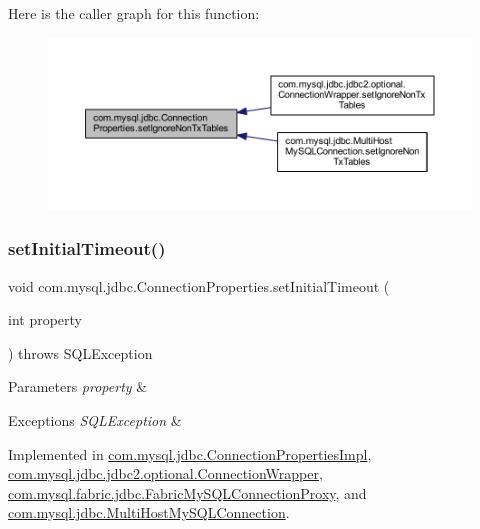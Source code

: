Here is the caller graph for this function\+:\nopagebreak
\begin{figure}[H]
\begin{center}
\leavevmode
\includegraphics[width=350pt]{interfacecom_1_1mysql_1_1jdbc_1_1_connection_properties_aef7c4c2447c9875392d6dff3452d9ac2_icgraph}
\end{center}
\end{figure}
\mbox{\label{interfacecom_1_1mysql_1_1jdbc_1_1_connection_properties_aaf6a88938cc10d9607cbcba5f3ac75a2}} 
\subsubsection{\texorpdfstring{set\+Initial\+Timeout()}{setInitialTimeout()}}
{\footnotesize\ttfamily void com.\+mysql.\+jdbc.\+Connection\+Properties.\+set\+Initial\+Timeout (\begin{DoxyParamCaption}\item[{int}]{property }\end{DoxyParamCaption}) throws S\+Q\+L\+Exception}


\begin{DoxyParams}{Parameters}
{\em property} & \\
\hline
\end{DoxyParams}

\begin{DoxyExceptions}{Exceptions}
{\em S\+Q\+L\+Exception} & \\
\hline
\end{DoxyExceptions}


Implemented in \mbox{\hyperlink{classcom_1_1mysql_1_1jdbc_1_1_connection_properties_impl_afcb603e0165494b6f9a1d0bf6b43e71c}{com.\+mysql.\+jdbc.\+Connection\+Properties\+Impl}}, \mbox{\hyperlink{classcom_1_1mysql_1_1jdbc_1_1jdbc2_1_1optional_1_1_connection_wrapper_af88d96aed55dd2fdd401b0d86dcc700d}{com.\+mysql.\+jdbc.\+jdbc2.\+optional.\+Connection\+Wrapper}}, \mbox{\hyperlink{classcom_1_1mysql_1_1fabric_1_1jdbc_1_1_fabric_my_s_q_l_connection_proxy_a2390b3ac539263d82ddcf9541c296c3d}{com.\+mysql.\+fabric.\+jdbc.\+Fabric\+My\+S\+Q\+L\+Connection\+Proxy}}, and \mbox{\hyperlink{classcom_1_1mysql_1_1jdbc_1_1_multi_host_my_s_q_l_connection_aeab355b0e9150013c3690b5be17ea12e}{com.\+mysql.\+jdbc.\+Multi\+Host\+My\+S\+Q\+L\+Connection}}.

